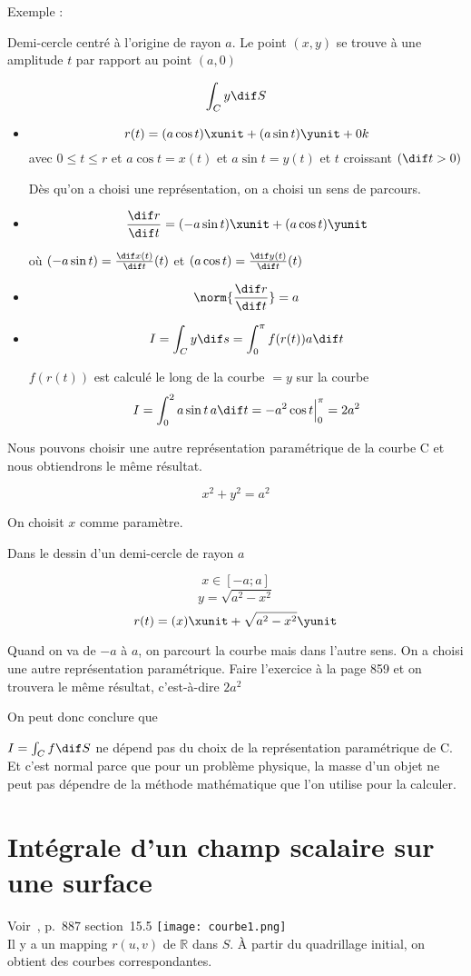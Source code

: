  Exemple :

 Demi-cercle centré à l'origine de rayon $a$. Le point $(x,y)$ se trouve à une amplitude $t$ par rapport au point $(a,0)$

 \[\int_C y \dif S\]

 \begin{itemize}

 \item
 \[r(t) = (a \cos t ) \xunit + ( a \sin t )\yunit +0k\]
avec $ 0\leq t \leq r $ et $a \cos t =x(t)$ et $a \sin t = y(t)$ et $t$ croissant $(\dif t>0)$

Dès qu'on a choisi une représentation, on a choisi un sens de parcours.
\item
\[\frac{\dif r}{\dif t}=(-a\sin t )\xunit + (a \cos t ) \yunit\]

 où $(-a\sin t ) = \frac{\dif x(t)}{\dif t}(t)$ et $(a\cos t ) = \frac{\dif y(t)}{\dif t}(t)$

\item \[\norm{\frac{\dif r}{\dif t}}=a\]
\item \[I = \int_C y \dif s = \int_0^{\pi} f(r(t))a\dif t\]

$f(r(t))$ est calculé le long de la courbe $= y$ sur la courbe
\[I=\int_0^2 a \sin{t} \, a \dif t = -a^2 \cos t \Big \rvert^\pi_0 =2a^2\]
 \end{itemize}

Nous pouvons choisir une autre représentation paramétrique de la courbe C et nous obtiendrons le même résultat.

\[x^2+y^2 = a^2\]

On choisit $x$ comme paramètre.

Dans le dessin d'un demi-cercle de rayon $a$

\[x \in [-a;a]\]
\[y=\sqrt{a^2-x^2}\]
\[r(t) = (x)\xunit + \sqrt{a^2-x^2} \yunit\]

Quand on va de $-a$ à $a$, on parcourt la courbe mais dans l'autre sens. On a choisi une autre représentation paramétrique. Faire l'exercice à la page 859 et on trouvera le même résultat, c'est-à-dire $2a^2$

On peut donc conclure que

$I=\int_C f \dif S$ ne dépend pas du choix de la représentation paramétrique de C. Et c'est normal parce que pour un problème physique, la masse d'un objet ne peut pas dépendre de la méthode mathématique que l'on utilise pour la calculer.

\section{Intégrale d'un champ scalaire sur une surface}
Voir~\cite{adams2013calculus}, p.~887 section~15.5
\texttt{[image: courbe1.png]}%
\\
Il y a un mapping $r(u,v)$ de $\mathbb{R}$ dans $S$. À partir du quadrillage initial, on obtient des courbes correspondantes.


